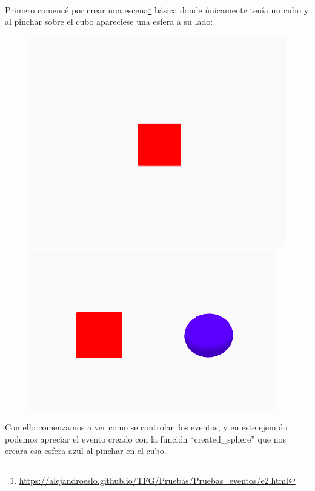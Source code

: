 \documentclass[a4paper, 12pt]{book}
\begin{document}
\newpage
Primero comencé por crear una escena\footnote{\url{https://alejandroeslo.github.io/TFG/Pruebas/Pruebas_eventos/e2.html}} básica donde únicamente tenía un cubo y al pinchar sobre el cubo apareciese una esfera a su lado:

\begin{figure}[h]
\centering
    \includegraphics[scale=0.35]{img/escena1_1a.png}
    \includegraphics[scale=0.45]{img/escena1_1b.png}
\end{figure}

Con ello comenzamos a ver como se controlan los eventos, y en este ejemplo podemos apreciar el evento creado con la función “created\_sphere” que nos creara esa esfera azul al pinchar en el cubo.
\end{document}
